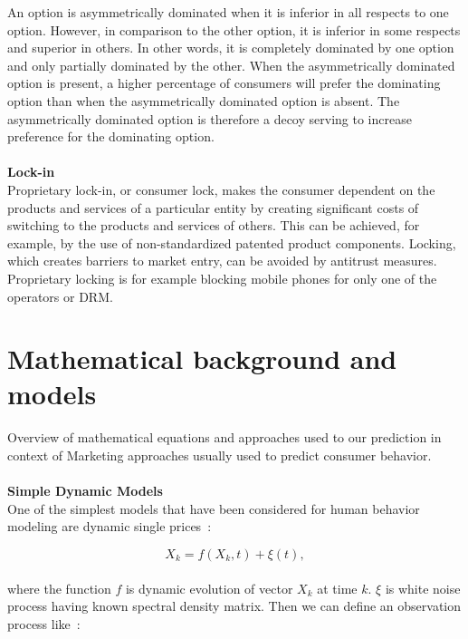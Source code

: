 An option is asymmetrically dominated when it is inferior in all respects to one option.
However, in comparison to the other option, it is inferior in some respects and superior in others.
In other words, it is completely dominated by one option and only partially dominated by the other.
When the asymmetrically dominated option is present, a higher percentage of consumers will prefer the dominating
option than when the asymmetrically dominated option is absent.
The asymmetrically dominated option is therefore a decoy serving to increase preference for the dominating option.\\
\\
\textbf{Lock-in} \label{subsec:lock-in}\\
Proprietary lock-in, or consumer lock, makes the consumer dependent on the products and services of a particular
entity by creating significant costs of switching to the products and services of others.
This can be achieved, for example, by the use of non-standardized patented product components.
Locking, which creates barriers to market entry, can be avoided by antitrust measures.
Proprietary locking is for example blocking mobile phones for only one of the operators or DRM.
\\
\section{Mathematical background and models} \label{sec:introduction}
Overview of mathematical equations and approaches used to our prediction in context of Marketing approaches usually used to predict consumer behavior.\\
\\
\textbf{Simple Dynamic Models} \label{subsec:simpleDynamicModels}\\
One of the simplest models that have been considered for human behavior modeling are dynamic single prices~\cite{pantland}:

\begin{equation} \label{eq:1}
X_k = f(X_k, t) + \xi(t),
\end{equation}
\\
where the function $f$ is dynamic evolution of vector $X_k$ at time $k$. $\xi$ is white noise process having known spectral density matrix.
Then we can define an observation process like~\cite{pantland}:

